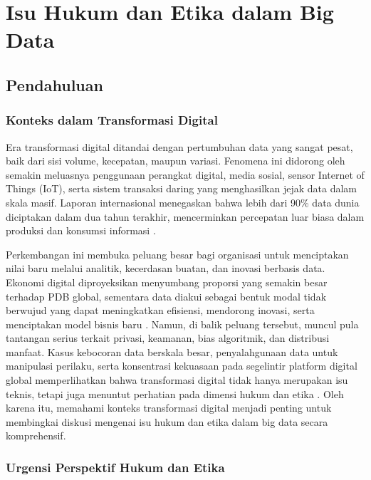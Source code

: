 \chapter{Isu Hukum dan Etika dalam Big Data}

\section{Pendahuluan}
\subsection{Konteks dalam Transformasi Digital}

Era transformasi digital ditandai dengan pertumbuhan data yang sangat pesat, baik dari sisi volume, kecepatan, maupun variasi. Fenomena ini didorong oleh semakin meluasnya penggunaan perangkat digital, media sosial, sensor Internet of Things (IoT), serta sistem transaksi daring yang menghasilkan jejak data dalam skala masif. Laporan internasional menegaskan bahwa lebih dari 90\% data dunia diciptakan dalam dua tahun terakhir, mencerminkan percepatan luar biasa dalam produksi dan konsumsi informasi \cite{mayer2013big, manyika2011bigdata}. 

Perkembangan ini membuka peluang besar bagi organisasi untuk menciptakan nilai baru melalui analitik, kecerdasan buatan, dan inovasi berbasis data. Ekonomi digital diproyeksikan menyumbang proporsi yang semakin besar terhadap PDB global, sementara data diakui sebagai bentuk modal tidak berwujud yang dapat meningkatkan efisiensi, mendorong inovasi, serta menciptakan model bisnis baru \cite{brynjolfsson2016competing, chen2014business}. Namun, di balik peluang tersebut, muncul pula tantangan serius terkait privasi, keamanan, bias algoritmik, dan distribusi manfaat. Kasus kebocoran data berskala besar, penyalahgunaan data untuk manipulasi perilaku, serta konsentrasi kekuasaan pada segelintir platform digital global memperlihatkan bahwa transformasi digital tidak hanya merupakan isu teknis, tetapi juga menuntut perhatian pada dimensi hukum dan etika \cite{oecd2015, zwitter2014}. Oleh karena itu, memahami konteks transformasi digital menjadi penting untuk membingkai diskusi mengenai isu hukum dan etika dalam big data secara komprehensif.

\subsection{Urgensi Perspektif Hukum dan Etika}

